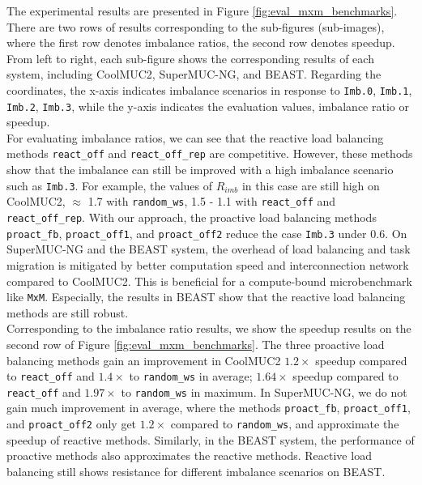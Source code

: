 The experimental results are presented in Figure \ref{fig:eval_mxm_benchmarks}. There are two rows of results corresponding to the sub-figures (sub-images), where the first row denotes imbalance ratios, the second row denotes speedup. From left to right, each sub-figure shows the corresponding results of each system, including CoolMUC2, SuperMUC-NG, and BEAST. Regarding the coordinates, the x-axis indicates imbalance scenarios in response to \texttt{Imb.0}, \texttt{Imb.1}, \texttt{Imb.2}, \texttt{Imb.3}, while the y-axis indicates the evaluation values, imbalance ratio or speedup.\\

For evaluating imbalance ratios, we can see that the reactive load balancing methods \texttt{react\_off} and \texttt{react\_off\_rep} are competitive. However, these methods show that the imbalance can still be improved with a high imbalance scenario such as \texttt{Imb.3}. For example, the values of $R_{imb}$ in this case are still high on CoolMUC2, $\approx$ 1.7 with \texttt{random\_ws}, 1.5 - 1.1 with \texttt{react\_off} and \texttt{react\_off\_rep}. With our approach, the proactive load balancing methods \texttt{proact\_fb}, \texttt{proact\_off1}, and \texttt{proact\_off2} reduce the case \texttt{Imb.3} under $0.6$. On SuperMUC-NG and the BEAST system, the overhead of load balancing and task migration is mitigated by better computation speed and interconnection network compared to CoolMUC2. This is beneficial for a compute-bound microbenchmark like \texttt{MxM}. Especially, the results in BEAST show that the reactive load balancing methods are still robust.\\

Corresponding to the imbalance ratio results, we show the speedup results on the second row of Figure \ref{fig:eval_mxm_benchmarks}. The three proactive load balancing methods gain an improvement in CoolMUC2 $1.2\times$ speedup compared to \texttt{react\_off} and $1.4\times$ to \texttt{random\_ws} in average;  $1.64\times$ speedup compared to \texttt{react\_off} and $1.97\times$ to \texttt{random\_ws} in maximum. In SuperMUC-NG, we do not gain much improvement in average, where the methods \texttt{proact\_fb}, \texttt{proact\_off1}, and \texttt{proact\_off2} only get $1.2\times$ compared to \texttt{random\_ws}, and approximate the speedup of reactive methods. Similarly, in the BEAST system, the performance of proactive methods also approximates the reactive methods. Reactive load balancing still shows resistance for different imbalance scenarios on BEAST.\\

